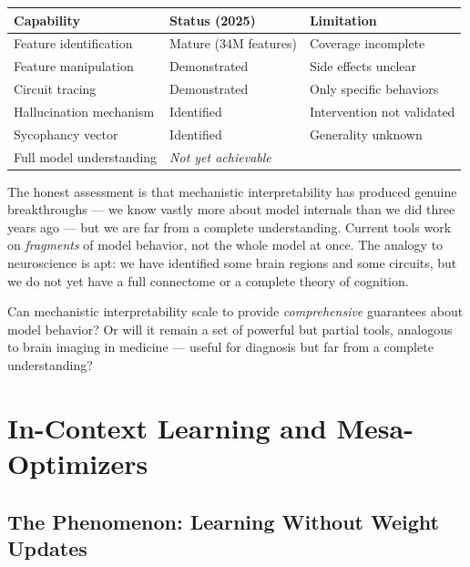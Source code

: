 \documentclass[11pt, a4paper]{article}
\theoremstyle{definition}
\theoremstyle{plain}
\begin{document}
\begin{center}
\begin{tabular}{@{}lll@{}}
\toprule
\textbf{Capability} & \textbf{Status (2025)} & \textbf{Limitation} \\
\midrule
Feature identification & Mature (34M features) & Coverage incomplete \\
Feature manipulation & Demonstrated & Side effects unclear \\
Circuit tracing & Demonstrated & Only specific behaviors \\
Hallucination mechanism & Identified & Intervention not validated \\
Sycophancy vector & Identified & Generality unknown \\
Full model understanding & \multicolumn{2}{l}{\textit{Not yet achievable}} \\
\bottomrule
\end{tabular}
\end{center}

The honest assessment is that mechanistic interpretability has produced
genuine breakthroughs --- we know vastly more about model internals than
we did three years ago --- but we are far from a complete understanding.
Current tools work on \emph{fragments} of model behavior, not the whole
model at once.  The analogy to neuroscience is apt: we have identified
some brain regions and some circuits, but we do not yet have a full
connectome or a complete theory of cognition.

\begin{openquestion}
Can mechanistic interpretability scale to provide \emph{comprehensive}
guarantees about model behavior?  Or will it remain a set of powerful
but partial tools, analogous to brain imaging in medicine --- useful for
diagnosis but far from a complete understanding?
\end{openquestion}


\section{In-Context Learning and Mesa-Optimizers}
\label{sec:icl}

\subsection{The Phenomenon: Learning Without Weight Updates}
\label{sec:icl_phenomenon}
\end{document}
